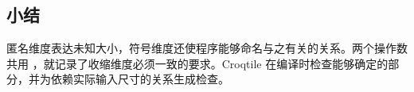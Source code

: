 \subsection*{小结}

匿名维度表达未知大小，符号维度还使程序能够命名与之有关的关系。两个操作数共用 \co@K@，就记录了收缩维度必须一致的要求。Croqtile 在编译时检查能够确定的部分，并为依赖实际输入尺寸的关系生成检查。
